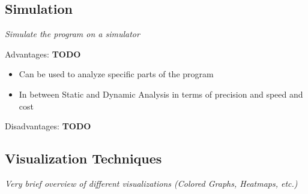 \subsection{Simulation}\label{sec:simulation}
\textit{Simulate the program on a simulator}

Advantages:
\textbf{TODO}
\begin{itemize}
  \item Can be used to analyze specific parts of the program
  \item In between Static and Dynamic Analysis in terms of precision and speed and cost
\end{itemize}
Disadvantages:
\textbf{TODO}

\subsection{Visualization Techniques}\label{sec:visualization}
\textit{Very brief overview of different visualizations (Colored Graphs, Heatmaps, etc.)}
